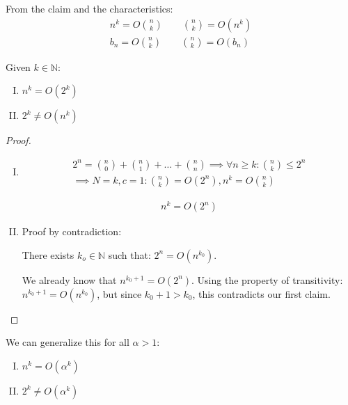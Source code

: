 \documentclass[00_complete]{subfiles}
\begin{document}
\begin{conclusion}
    From the claim and the characteristics:
    $$
    \begin{gathered}
        n^k = O\binom{n}{k} \qquad \binom{n}{k} = O(n^k) \\
        b_n = O\binom{n}{k} \qquad \binom{n}{k} = O(b_n)
    \end{gathered}
    $$
\end{conclusion}
\begin{claim}
    Given $k \in \mathbb{N}$:
\begin{enumerate}[I.]
    \item $n^k=O(2^k)$
    \item $2^k \neq O(n^k)$
\end{enumerate}
\begin{proof}
    \begin{enumerate}[I.]
    \item \begin{gather*}
        2^n = \binom{n}{0} + \binom{n}{1} + \dots + \binom{n}{n} \implies
        \forall n \geq k: \binom{n}{k}\leq 2^n \\
        \implies N=k, c=1: \binom{n}{k}=O(2^n), n^k=O\binom{n}{k}
    \end{gather*}
    \begin{conclusion}
        \begin{gather*}
            n^k=O(2^n) \tag{\checkmark}
        \end{gather*}
    \end{conclusion}
    \item Proof by contradiction:

    There exists $k_o \in \mathbb{N}$ such that: $2^n = O(n^{k_0})$.

    We already know that $n^{k_0+1}=O(2^n)$. Using the property of
    transitivity: $n^{k_0+1}=O(n^{k_0})$, but since $k_0+1>k_0$, this
    contradicts our first claim.
    \end{enumerate}
\end{proof}
\begin{note}
    We can generalize this for all $\alpha>1$:
\begin{enumerate}[I.]
    \item $n^k=O(\alpha^k)$
    \item $2^k \neq O(\alpha^k)$
\end{enumerate}
\end{note}
\end{claim}
\end{document}
